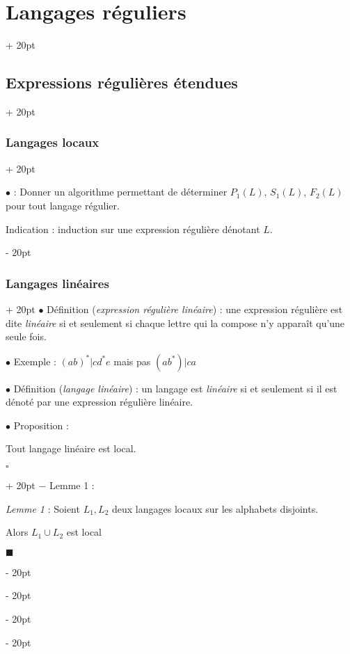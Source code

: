 \documentclass[a4paper, 12pt, twoside]{article}
\newcommand{\ind}[1][20pt]{\advance\leftskip + #1}
\newcommand{\deind}[1][20pt]{\advance\leftskip - #1}
\newenvironment{indt}[2][20pt]{#2 \par \ind[#1]}{\par \deind} %
\newenvironment{proof}[1][{}]{\begin{indt}{$\square$ #1}}{$\blacksquare$ \end{indt}}
\begin{document}
\begin{indt}{\section{Langages réguliers}}
\begin{indt}{\subsection{Expressions régulières étendues}}
\begin{indt}{\subsubsection{Langages locaux}}
                \vspace{12pt}
                
                $\bullet$  : Donner un algorithme permettant de déterminer $P_1(L)$, $S_1(L)$, $F_2(L)$ pour tout langage régulier.

                Indication : induction sur une expression régulière dénotant $L$.
            \end{indt}

            \vspace{12pt}
            
            \begin{indt}{\subsubsection{Langages linéaires}}
                $\bullet$ Définition (\emph{expression régulière linéaire}) : une expression régulière est dite \emph{linéaire} si et seulement si chaque lettre qui la compose n'y apparaît qu'une seule fois.

                \vspace{12pt}
                
                $\bullet$ Exemple : $(ab)^* | cd^*e$ mais pas $(ab^*)|ca$

                \vspace{12pt}
                
                $\bullet$ Définition (\emph{langage linéaire}) : un langage est \emph{linéaire} si et seulement si il est dénoté par une expression régulière linéaire.

                \vspace{12pt}
                
                $\bullet$ Proposition :
                \begin{emphBox}
                    Tout langage linéaire est local.
                \end{emphBox}

                \vspace{6pt}
                
                \begin{proof}
                    $-$ Lemme 1 :
                    \begin{emphBox}
                        \textit{Lemme 1} :
                        Soient $L_1, L_2$ deux langages locaux sur les alphabets disjoints.

                        Alors $L_1 \cup L_2$ est local
                    \end{emphBox}


\end{proof}
\end{indt}
\end{indt}
\end{indt}
\end{document}
